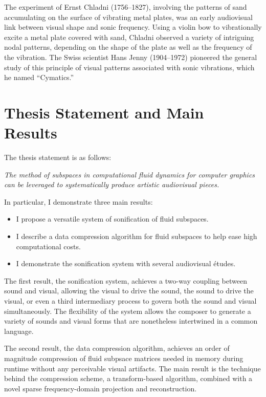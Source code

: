 The experiment of Ernst Chladni (1756--1827), involving the patterns of sand accumulating on the surface of vibrating metal plates, was an early audiovisual link between visual shape and sonic frequency. Using a violin bow to vibrationally excite a metal plate covered with sand, Chladni observed a variety of intriguing nodal patterns, depending on the shape of the plate as well as the frequency of the vibration. The Swiss scientist Hans Jenny (1904--1972) pioneered the general study of this principle of visual patterns associated with sonic vibrations, which he named ``Cymatics.'' 


\section{Thesis Statement and Main Results}
The thesis statement is as follows:

\begin{addmargin}[1em]{2em}
{\em The method of subspaces in computational fluid dynamics for computer graphics can be leveraged to systematically produce artistic audiovisual pieces.}
\end{addmargin}
In particular, I demonstrate three main results:

\begin{itemize}
	\item I propose a versatile system of sonification of fluid subspaces.
	\item I describe a data compression algorithm for fluid subspaces to help ease high computational costs.
	\item I demonstrate the sonification system with several audiovisual {\'e}tudes.
\end{itemize}

The first result, the sonification system, achieves a two-way coupling between sound and visual, allowing the visual to drive the sound, the sound to drive the visual, or even a third intermediary process to govern both the sound and visual simultaneously. The flexibility of the system allows the composer to generate a variety of sounds and visual forms that are nonetheless intertwined in a common language. 

The second result, the data compression algorithm, achieves an order of magnitude compression of fluid subpsace matrices needed in memory during runtime without any perceivable visual artifacts. The main result is the technique behind the compression scheme, a transform-based algorithm, combined with a novel sparse frequency-domain projection and reconstruction.

